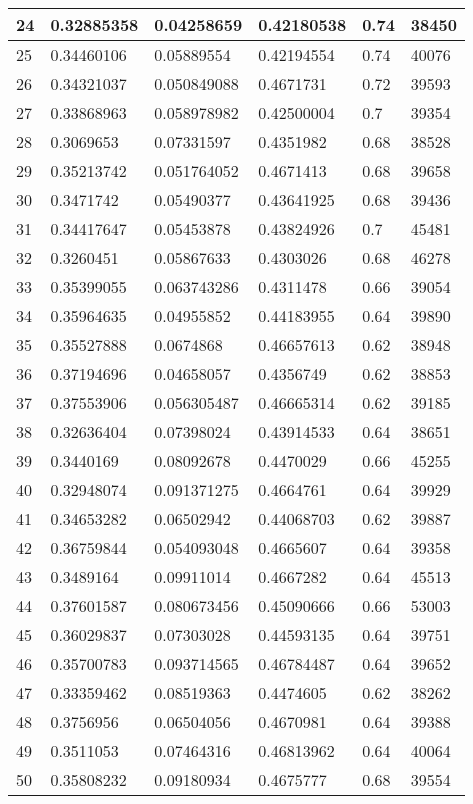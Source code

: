 \begin{longtable}{|l|l|l|l|l|l|}
24 & 0.32885358 & 0.04258659 & 0.42180538 & 0.74 & 38450 \\ \hline 
25 & 0.34460106 & 0.05889554 & 0.42194554 & 0.74 & 40076 \\ \hline 
26 & 0.34321037 & 0.050849088 & 0.4671731 & 0.72 & 39593 \\ \hline 
27 & 0.33868963 & 0.058978982 & 0.42500004 & 0.7 & 39354 \\ \hline 
28 & 0.3069653 & 0.07331597 & 0.4351982 & 0.68 & 38528 \\ \hline 
29 & 0.35213742 & 0.051764052 & 0.4671413 & 0.68 & 39658 \\ \hline 
30 & 0.3471742 & 0.05490377 & 0.43641925 & 0.68 & 39436 \\ \hline 
31 & 0.34417647 & 0.05453878 & 0.43824926 & 0.7 & 45481 \\ \hline 
32 & 0.3260451 & 0.05867633 & 0.4303026 & 0.68 & 46278 \\ \hline 
33 & 0.35399055 & 0.063743286 & 0.4311478 & 0.66 & 39054 \\ \hline 
34 & 0.35964635 & 0.04955852 & 0.44183955 & 0.64 & 39890 \\ \hline 
35 & 0.35527888 & 0.0674868 & 0.46657613 & 0.62 & 38948 \\ \hline 
36 & 0.37194696 & 0.04658057 & 0.4356749 & 0.62 & 38853 \\ \hline 
37 & 0.37553906 & 0.056305487 & 0.46665314 & 0.62 & 39185 \\ \hline 
38 & 0.32636404 & 0.07398024 & 0.43914533 & 0.64 & 38651 \\ \hline 
39 & 0.3440169 & 0.08092678 & 0.4470029 & 0.66 & 45255 \\ \hline 
40 & 0.32948074 & 0.091371275 & 0.4664761 & 0.64 & 39929 \\ \hline 
41 & 0.34653282 & 0.06502942 & 0.44068703 & 0.62 & 39887 \\ \hline 
42 & 0.36759844 & 0.054093048 & 0.4665607 & 0.64 & 39358 \\ \hline 
43 & 0.3489164 & 0.09911014 & 0.4667282 & 0.64 & 45513 \\ \hline 
44 & 0.37601587 & 0.080673456 & 0.45090666 & 0.66 & 53003 \\ \hline 
45 & 0.36029837 & 0.07303028 & 0.44593135 & 0.64 & 39751 \\ \hline 
46 & 0.35700783 & 0.093714565 & 0.46784487 & 0.64 & 39652 \\ \hline 
47 & 0.33359462 & 0.08519363 & 0.4474605 & 0.62 & 38262 \\ \hline 
48 & 0.3756956 & 0.06504056 & 0.4670981 & 0.64 & 39388 \\ \hline 
49 & 0.3511053 & 0.07464316 & 0.46813962 & 0.64 & 40064 \\ \hline 
50 & 0.35808232 & 0.09180934 & 0.4675777 & 0.68 & 39554 \\ \hline 
\end{longtable}